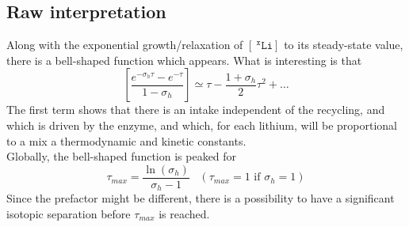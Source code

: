 \documentclass[aps,onecolumn,11pt]{revtex4}
\newcommand{\mychem}[1]{\mathtt{#1}}
\newcommand{\myconc}[1]{\left\lbrack{#1}\right\rbrack}
\newcommand{\spLi}[1]{{~^{\mychem{#1}}\mychem{Li}}}
\newcommand{\Li}[1]{\myconc{\spLi{#1}}}
\begin{document}
\subsection{Raw interpretation}
Along with the exponential growth/relaxation of $\Li{x}$ to its steady-state value, there is a bell-shaped function which appears.
What is interesting is that
\begin{equation}
	\left[
	 \dfrac{e^{-\sigma_h\tau} - e^{-\tau} }{1 - \sigma_h}\right] 
	 \simeq \tau - \dfrac{1+\sigma_h}{2} \tau^2 + \ldots
\end{equation}
The first term shows that there is an intake independent of the recycling, and which is driven by the enzyme, and which, for each lithium, will be proportional to a mix a thermodynamic and kinetic constants.\\
Globally, the bell-shaped function is peaked for
\begin{equation}
	\tau_{max} = \dfrac{\ln(\sigma_h)}{\sigma_h-1}\;\;\;(\tau_{max}=1 \text{ if } \sigma_h=1)
\end{equation}
Since the prefactor might be different, there is a possibility to have a significant isotopic separation before $\tau_{max}$ is reached.
\end{document}
